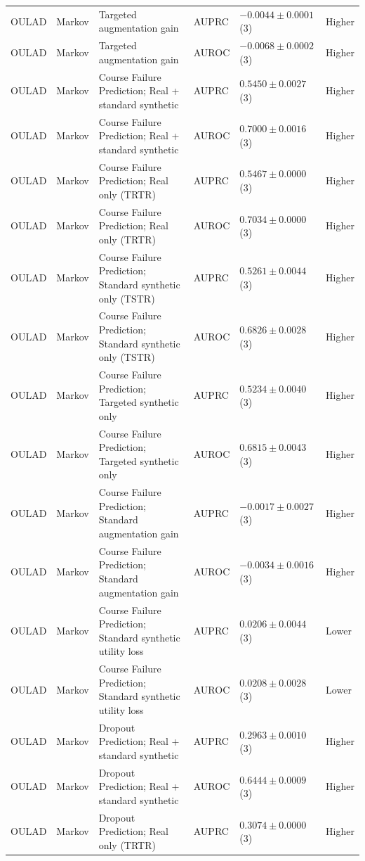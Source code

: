 \begin{longtable}{@{}p{2.25cm}p{2.05cm}p{4.7cm}p{5.0cm}p{2.6cm}p{1.25cm}@{}}
OULAD & Markov & Targeted augmentation gain & AUPRC & $-0.0044 \mathbin{\pm} 0.0001$ (3) & Higher \\
OULAD & Markov & Targeted augmentation gain & AUROC & $-0.0068 \mathbin{\pm} 0.0002$ (3) & Higher \\
OULAD & Markov & Course Failure Prediction; Real + standard synthetic & AUPRC & $0.5450 \mathbin{\pm} 0.0027$ (3) & Higher \\
OULAD & Markov & Course Failure Prediction; Real + standard synthetic & AUROC & $0.7000 \mathbin{\pm} 0.0016$ (3) & Higher \\
OULAD & Markov & Course Failure Prediction; Real only (TRTR) & AUPRC & $0.5467 \mathbin{\pm} 0.0000$ (3) & Higher \\
OULAD & Markov & Course Failure Prediction; Real only (TRTR) & AUROC & $0.7034 \mathbin{\pm} 0.0000$ (3) & Higher \\
OULAD & Markov & Course Failure Prediction; Standard synthetic only (TSTR) & AUPRC & $0.5261 \mathbin{\pm} 0.0044$ (3) & Higher \\
OULAD & Markov & Course Failure Prediction; Standard synthetic only (TSTR) & AUROC & $0.6826 \mathbin{\pm} 0.0028$ (3) & Higher \\
OULAD & Markov & Course Failure Prediction; Targeted synthetic only & AUPRC & $0.5234 \mathbin{\pm} 0.0040$ (3) & Higher \\
OULAD & Markov & Course Failure Prediction; Targeted synthetic only & AUROC & $0.6815 \mathbin{\pm} 0.0043$ (3) & Higher \\
OULAD & Markov & Course Failure Prediction; Standard augmentation gain & AUPRC & $-0.0017 \mathbin{\pm} 0.0027$ (3) & Higher \\
OULAD & Markov & Course Failure Prediction; Standard augmentation gain & AUROC & $-0.0034 \mathbin{\pm} 0.0016$ (3) & Higher \\
OULAD & Markov & Course Failure Prediction; Standard synthetic utility loss & AUPRC & $0.0206 \mathbin{\pm} 0.0044$ (3) & Lower \\
OULAD & Markov & Course Failure Prediction; Standard synthetic utility loss & AUROC & $0.0208 \mathbin{\pm} 0.0028$ (3) & Lower \\
OULAD & Markov & Dropout Prediction; Real + standard synthetic & AUPRC & $0.2963 \mathbin{\pm} 0.0010$ (3) & Higher \\
OULAD & Markov & Dropout Prediction; Real + standard synthetic & AUROC & $0.6444 \mathbin{\pm} 0.0009$ (3) & Higher \\
OULAD & Markov & Dropout Prediction; Real only (TRTR) & AUPRC & $0.3074 \mathbin{\pm} 0.0000$ (3) & Higher \\

\end{longtable}

